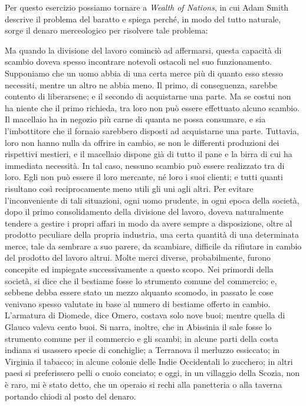 \documentclass[
  a5paper,
  smalldemyvopaper,10pt,twoside,onecolumn,openright,extrafontsizes,hidelinks]{memoir}
\renewenvironment{quote}%
               {\list{}{\rightmargin=.6cm\leftmargin=.6cm}%
                \itshape \item[]}%
               {\endlist}
\begin{document}
Per questo esercizio possiamo tornare a \emph{Wealth of Nations}, in cui
Adam Smith descrive il problema del baratto e spiega perché, in modo del
tutto naturale, sorge il denaro merceologico per risolvere tale
problema:

\begin{quote}
Ma quando la divisione del lavoro cominciò ad affermarsi, questa
capacità di scambio doveva spesso incontrare notevoli ostacoli nel suo
funzionamento. Supponiamo che un uomo abbia di una certa merce più di
quanto esso stesso necessiti, mentre un altro ne abbia meno. Il primo,
di conseguenza, sarebbe contento di liberarsene; e il secondo di
acquistarne una parte. Ma se costui non ha niente che il primo richieda,
tra loro non può essere effettuato alcuno scambio. Il macellaio ha in
negozio più carne di quanta ne possa consumare, e sia l'imbottitore che
il fornaio sarebbero disposti ad acquistarne una parte. Tuttavia, loro
non hanno nulla da offrire in cambio, se non le differenti produzioni
dei rispettivi mestieri, e il macellaio dispone già di tutto il pane e
la birra di cui ha immediata necessità. In tal caso, nessuno scambio può
essere realizzato tra di loro. Egli non può essere il loro mercante, né
loro i suoi clienti; e tutti quanti risultano così reciprocamente meno
utili gli uni agli altri. Per evitare l'inconveniente di tali
situazioni, ogni uomo prudente, in ogni epoca della società, dopo il
primo consolidamento della divisione del lavoro, doveva naturalmente
tendere a gestire i propri affari in modo da avere sempre a
disposizione, oltre al prodotto peculiare della propria industria, una
certa quantità di una determinata merce, tale da sembrare a suo parere,
da scambiare, difficile da rifiutare in cambio del prodotto del lavoro
altrui. Molte merci diverse, probabilmente, furono concepite ed
impiegate successivamente a questo scopo. Nei primordi della società, si
dice che il bestiame fosse lo strumento comune del commercio; e, sebbene
debba essere stato un mezzo alquanto scomodo, in passato le cose
venivano spesso valutate in base al numero di bestiame offerto in
cambio. L'armatura di Diomede, dice Omero, costava solo nove buoi;
mentre quella di Glauco valeva cento buoi. Si narra, inoltre, che in
Abissinia il sale fosse lo strumento comune per il commercio e gli
scambi; in alcune parti della costa indiana si usassero specie di
conchiglie; a Terranova il merluzzo essiccato; in Virginia il tabacco;
in alcune colonie delle Indie Occidentali lo zucchero; in altri paesi si
preferissero pelli o cuoio conciato; e oggi, in un villaggio della
Scozia, non è raro, mi è stato detto, che un operaio si rechi alla
panetteria o alla taverna portando chiodi al posto del denaro.
\end{quote}
\end{document}
